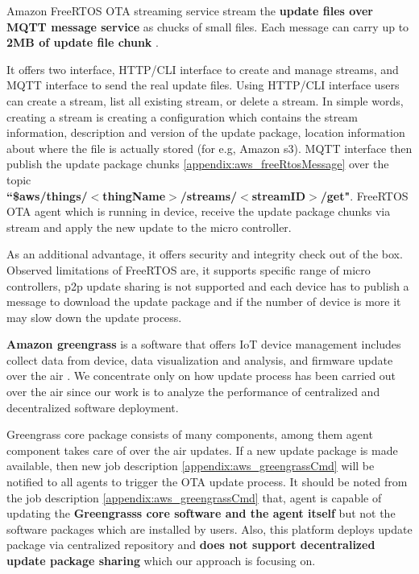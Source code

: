 \documentclass[12pt]{article}
\begin{document}
Amazon FreeRTOS OTA streaming service stream the \textbf{update files over MQTT message service} as chucks of small files. Each message can carry up to \textbf{2MB of update file chunk} \cite{misc03}.

It offers two interface, HTTP/CLI interface to create and manage streams, and MQTT interface to send the real update files. Using HTTP/CLI interface users can create a stream, list all existing stream, or delete a stream.  In simple words, creating a stream is creating a configuration which contains the stream information, description and version of the update package, location information about where the file is actually stored (for e.g, Amazon s3). MQTT interface then publish the update package chunks \ref{appendix:aws_freeRtosMessage} over the topic \\ \textbf{``\$aws/things/$<$thingName$>$/streams/$<$streamID$>$/get"}. FreeRTOS OTA agent which is running in device, receive the update package chunks via stream and apply the new update to the micro controller. 

As an additional advantage, it offers security and integrity check out of the box. Observed limitations of FreeRTOS are, it supports specific range of micro controllers, p2p update sharing is not supported and each device has to publish a message to download the update package and if the number of device is more it may slow down the update process.

\textbf{Amazon greengrass} is a software that offers IoT device management includes collect data from device, data visualization and analysis, and firmware update over the air \cite{misc04}. We concentrate only on how update process has been carried out over the air since our work is to analyze the performance of centralized and decentralized software deployment.

Greengrass core package consists of many components, among them agent component takes care of over the air updates. If a new update package is made available, then new job description \ref{appendix:aws_greengrassCmd} will be notified to all agents to  trigger the OTA update process. It should be noted from the job description \ref{appendix:aws_greengrassCmd} that, agent is capable of updating the \textbf{Greengrasss core software and the agent itself} \cite{misc04} but not the software packages which are installed by users. Also, this platform deploys update package via centralized repository and \textbf{does not support decentralized update package sharing} which our approach is focusing on. 
\end{document}
